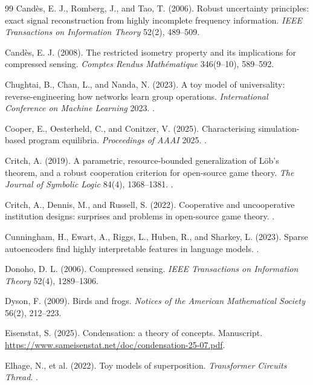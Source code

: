 \begin{thebibliography}{99}
 Cand\`es, E. J., Romberg, J., and Tao, T. (2006). Robust uncertainty principles: exact signal reconstruction from highly incomplete frequency information. \emph{IEEE Transactions on Information Theory} 52(2), 489--509.

 Cand\`es, E. J. (2008). The restricted isometry property and its implications for compressed sensing. \emph{Comptes Rendus Math\'ematique} 346(9--10), 589--592.




 Chughtai, B., Chan, L., and Nanda, N. (2023). A toy model of universality: reverse-engineering how networks learn group operations. \emph{International Conference on Machine Learning} 2023. .

 Cooper, E., Oesterheld, C., and Conitzer, V. (2025). Characterising simulation-based program equilibria. \emph{Proceedings of AAAI} 2025. .

 Critch, A. (2019). A parametric, resource-bounded generalization of L\"ob's theorem, and a robust cooperation criterion for open-source game theory. \emph{The Journal of Symbolic Logic} 84(4), 1368--1381. .

 Critch, A., Dennis, M., and Russell, S. (2022). Cooperative and uncooperative institution designs: surprises and problems in open-source game theory. .

 Cunningham, H., Ewart, A., Riggs, L., Huben, R., and Sharkey, L. (2023). Sparse autoencoders find highly interpretable features in language models. .


 Donoho, D. L. (2006). Compressed sensing. \emph{IEEE Transactions on Information Theory} 52(4), 1289--1306.

 Dyson, F. (2009). Birds and frogs. \emph{Notices of the American Mathematical Society} 56(2), 212--223.



 Eisenstat, S. (2025). Condensation: a theory of concepts. Manuscript. \url{https://www.sameisenstat.net/doc/condensation-25-07.pdf}.

 Elhage, N., et al. (2022). Toy models of superposition. \emph{Transformer Circuits Thread}. .






\end{thebibliography}
